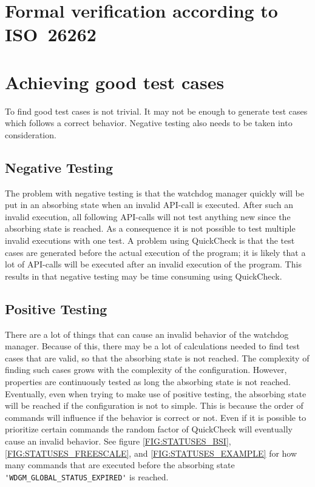 \section{Formal verification according to ISO~26262}

\section{Achieving good test cases}
To find good test cases is not trivial. It may not be enough to
generate test cases which follows a correct behavior. Negative testing
also needs to be taken into consideration.

\subsection{Negative Testing}
The problem with negative testing is that the watchdog manager quickly
will be put in an absorbing state when an invalid API-call is
executed. After such an invalid execution, all following API-calls
will not test anything new since the absorbing state is reached. As a
consequence it is not possible to test multiple invalid executions
with one test. A problem using QuickCheck is that the test cases are
generated before the actual execution of the program; it is likely
that a lot of API-calls will be executed after an invalid execution of
the program. This results in that negative testing may be time
consuming using QuickCheck.

\subsection{Positive Testing}
There are a lot of things that can cause an invalid behavior of the
watchdog manager. Because of this, there may be a lot of calculations
needed to find test cases that are valid, so that the absorbing state
is not reached. The complexity of finding such cases grows with the
complexity of the configuration. However, properties are continuously
tested as long the absorbing state is not reached. Eventually, even
when trying to make use of positive testing, the absorbing state will
be reached if the configuration is not to simple. This is because the
order of commands will influence if the behavior is correct or
not. Even if it is possible to prioritize certain commands the random
factor of QuickCheck will eventually cause an invalid behavior. See
figure \ref{FIG:STATUSES_BSI}, \ref{FIG:STATUSES_FREESCALE}, and
\ref{FIG:STATUSES_EXAMPLE} for how many commands that are executed
before the absorbing state \lstinline!'WDGM_GLOBAL_STATUS_EXPIRED'! is
reached.

